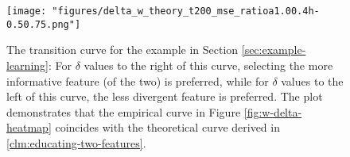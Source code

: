 \begin{figure}[ht]
        \centering
\texttt{[image: "figures/delta\_w\_theory\_t200\_mse\_ratioa1.00.4h-0.50.75.png"]}
     
        
    \caption{The transition curve for the example in Section \ref{sec:example-learning}: For $\delta$ values to the right of this curve, selecting the more informative feature (of the two) is preferred, while for $\delta$ values to the left of this curve, the less divergent feature is preferred. 
    The plot demonstrates that the empirical curve in Figure \ref{fig:w-delta-heatmap} coincides with the theoretical curve derived in \cref{clm:educating-two-features}.
    }
    \label{fig:theory-fit-simulation}
\end{figure}

\FloatBarrier